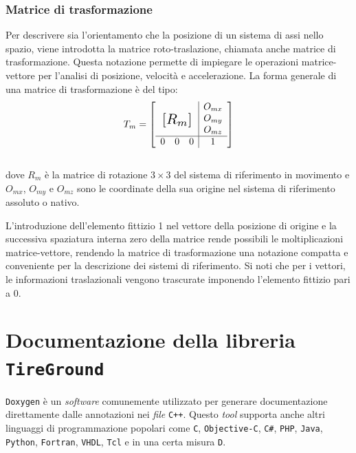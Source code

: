\subsection{Matrice di trasformazione}
Per descrivere sia l'orientamento che la posizione di un sistema di assi nello spazio, viene introdotta la matrice roto-traslazione, chiamata anche matrice di trasformazione. Questa notazione permette di impiegare le operazioni matrice-vettore per l'analisi di posizione, velocità e accelerazione. La forma generale di una matrice di trasformazione è del tipo:
%
\begin{equation}
T_m = \left[
\begin{array}{ccc|c}
& & & O_{mx}\\
\multicolumn{3}{c|}{\multirow{3}{*}{\raisebox{20mm}{\scalebox{1.5}{$[R_m]$}}}} & O_{my}\\
& & & O_{mz}\\ \hline
0 & 0 & 0 & 1
\end{array}\right]
\end{equation}\\
%
dove $R_m$ è la matrice di rotazione $3 \times 3$ del sistema di riferimento in movimento e $O_{mx}$, $O_{my}$ e $O_{mz}$ sono le coordinate della sua origine nel sistema di riferimento assoluto o nativo.

L'introduzione dell'elemento fittizio 1 nel vettore della posizione di origine e la successiva spaziatura interna zero della matrice rende possibili le moltiplicazioni matrice-vettore, rendendo la matrice di trasformazione una notazione compatta e conveniente per la descrizione dei sistemi di riferimento. Si noti che per i vettori, le informazioni traslazionali vengono trascurate imponendo l'elemento fittizio pari a 0.
%
\chapter{Documentazione della libreria \texttt{TireGround}}
\label{Documentation}
%
\texttt{Doxygen} è un \textit{software} comunemente utilizzato per generare documentazione direttamente dalle annotazioni nei \textit{file} \texttt{C++}. Questo \textit{tool} supporta anche altri linguaggi di programmazione popolari come \texttt{C}, \texttt{Objective-C}, \texttt{C\#}, \texttt{PHP},  \texttt{Java},  \texttt{Python}, \texttt{Fortran},  \texttt{VHDL},  \texttt{Tcl} e in una certa misura  \texttt{D}.

